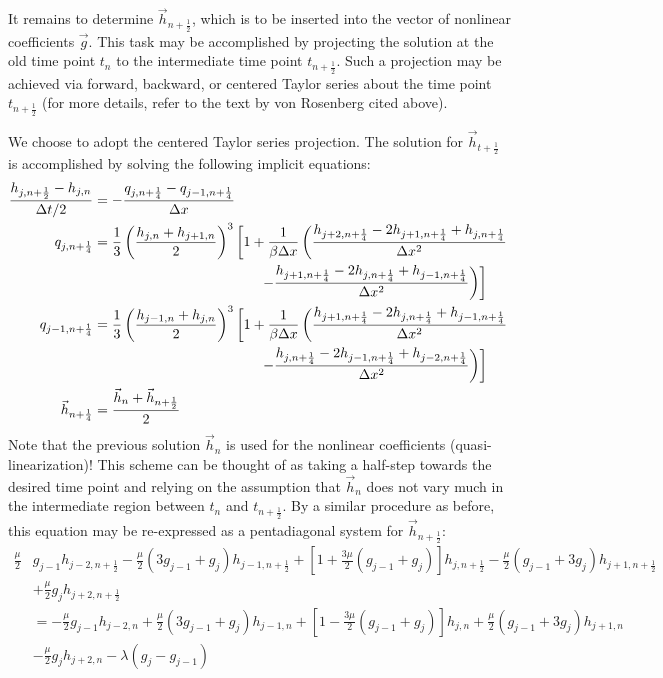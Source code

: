 \documentclass[12pt]{article}
\numberwithin{equation}{section}
\begin{document}
It remains to determine $\vec{h}_{n+\frac{1}{2}}$, which is to be inserted into the vector of nonlinear coefficients $\vec{g}$. This task may be accomplished by projecting the solution at the old time point $t_n$ to the intermediate time point $t_{n+\frac{1}{2}}$. Such a projection may be achieved via forward, backward, or centered Taylor series about the time point $t_{n+\frac{1}{2}}$ (for more details, refer to the text by von Rosenberg cited above). 

We choose to adopt the centered Taylor series projection. The solution for $\vec{h}_{t+\frac{1}{2}}$ is accomplished by solving the following implicit equations:
\begin{align}
	\frac{h_{j, {n+\frac{1}{2}}}-h_{j,n}}{\Delta t/2}
	&=
	- \frac{q_{j,n+\frac{1}{4}}-q_{j-1,n+\frac{1}{4}}}{\Delta x}
	\\
	q_{j,n+\frac{1}{4}}
	&=
	\frac{1}{3} \left(
		\frac{h_{j,n}+h_{j+1,n}}{2}
	\right)^3
	\left[
		1 + \frac{1}{\beta \Delta x} \left(
			\frac{h_{j+2,n+\frac{1}{4}} - 2 h_{j+1,n+\frac{1}{4}}+ h_{j,n+\frac{1}{4}}}{\Delta x^2}
	\right.
	\right.
	\nonumber \\ &\hphantom{=\frac{1}{3} \left(
		\frac{h_{j,n}+h_{j+1,n}}{2}
	\right)^3
	\bigg[1+}
	\left.
	\left.
			-
			\frac{h_{j+1,n+\frac{1}{4}} - 2 h_{j,n+\frac{1}{4}}+ h_{j-1,n+\frac{1}{4}}}{\Delta x^2}
		\right)
	\right]
	\\
	q_{j-1,n+\frac{1}{4}}
	&=
	\frac{1}{3} \left(
		\frac{h_{j-1,n}+h_{j,n}}{2}
	\right)^3
	\left[
		1 + \frac{1}{\beta \Delta x} \left(
			\frac{h_{j+1,n+\frac{1}{4}} - 2 h_{j,n+\frac{1}{4}}+ h_{j-1,n+\frac{1}{4}}}{\Delta x^2}
	\right.
	\right.
	\nonumber \\ &\hphantom{=\frac{1}{3} \left(
		\frac{h_{j,n}+h_{j+1,n}}{2}
	\right)^3
	\bigg[1+}
	\left.
	\left.
			-
			\frac{h_{j,n+\frac{1}{4}} - 2 h_{j-1,n+\frac{1}{4}}+ h_{j-2,n+\frac{1}{4}}}{\Delta x^2}
		\right)
	\right]
	\\
	\vec{h}_{n+\frac{1}{4}}
	&=
	\frac{\vec{h}_{n} + \vec{h}_{n+\frac{1}{2}}}{2}
\end{align}
Note that the previous solution $\vec{h}_n$ is used for the nonlinear coefficients (quasi-linearization)! This scheme can be thought of as taking a half-step towards the desired time point and relying on the assumption that $\vec{h}_n$ does not vary much in the intermediate region between $t_{n}$ and $t_{n+\frac{1}{2}}$. By a similar procedure as before, this equation may be re-expressed as a pentadiagonal system for $\vec{h}_{n+\frac{1}{2}}$:
\begin{align}
	\frac{\mu}{2}& g_{j-1} h_{j-2, n+\frac{1}{2}}
	-  \frac{\mu}{2} (3g_{j-1} + g_{j}) h_{j-1,n+\frac{1}{2}}
	+\left[1 +  \frac{3\mu}{2} ( g_{j-1}+ g_j )\right]h_{j, {n+\frac{1}{2}}}
	- \frac{\mu}{2} (g_{j-1} + 3 g_{j}) h_{j+1,n+\frac{1}{2}} 
	\nonumber \\ &
	+ \frac{\mu}{2} g_{j} h_{j+2,n+\frac{1}{2}} 
	\nonumber \\ 
	&=
	-  \frac{\mu}{2}  g_{j-1} h_{j-2,n}
	+ \frac{\mu}{2} (3 g_{j-1}+ g_j ) h_{j-1,n}
	+\left[1 - \frac{3\mu}{2} (g_{j-1} + g_j) \right]h_{j,n}
	+ \frac{\mu}{2} ( g_{j-1}+ 3g_j )h_{j+1,n}
	\nonumber \\ &
	- \frac{\mu}{2} g_j h_{j+2,n}
	- \lambda(g_j - g_{j-1})
\end{align}
\end{document}
